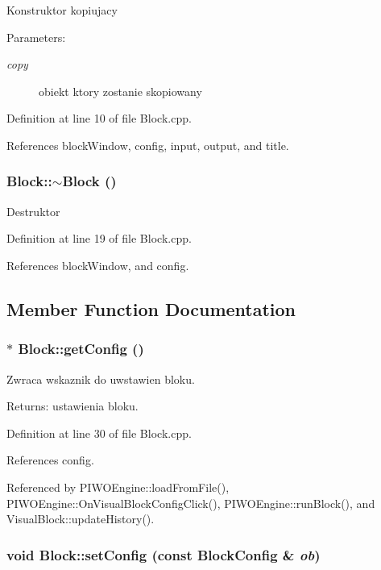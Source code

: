 Konstruktor kopiujacy \begin{Desc}
\item[Parameters:]
\begin{description}
\item[{\em copy}]obiekt ktory zostanie skopiowany \end{description}
\end{Desc}


Definition at line 10 of file Block.cpp.

References blockWindow, config, input, output, and title.\hypertarget{classBlock_19d1bd0e1cef6a865ed2745a2e648405}{
\subsubsection[$\sim$Block]{\setlength{\rightskip}{0pt plus 5cm}Block::$\sim$Block ()}}
\label{classBlock_19d1bd0e1cef6a865ed2745a2e648405}


Destruktor 

Definition at line 19 of file Block.cpp.

References blockWindow, and config.

\subsection{Member Function Documentation}
\hypertarget{classBlock_17985f527bea557c7da9279424d96ccc}{
\subsubsection[getConfig]{ $\ast$ Block::getConfig ()}}
\label{classBlock_17985f527bea557c7da9279424d96ccc}


Zwraca wskaznik do uwstawien bloku. \begin{Desc}
\item[Returns:]ustawienia bloku. \end{Desc}


Definition at line 30 of file Block.cpp.

References config.

Referenced by PIWOEngine::loadFromFile(), PIWOEngine::OnVisualBlockConfigClick(), PIWOEngine::runBlock(), and VisualBlock::updateHistory().\hypertarget{classBlock_703019dc511468104b327bff7dd779d2}{
\subsubsection[setConfig]{\setlength{\rightskip}{0pt plus 5cm}void Block::setConfig (const {\bf BlockConfig} \& {\em ob})}}
\label{classBlock_703019dc511468104b327bff7dd779d2}


